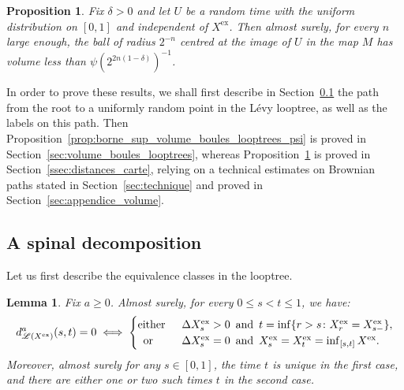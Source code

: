 \documentclass[british, a4paper,11pt]{article}
\numberwithin{equation}{section}
\newtheorem{lem}[thm]{Lemma}
\newtheorem{prop}[thm]{Proposition}
\theoremstyle{definition}
\newcommand{\Loop}{\mathscr{L}}
\newcommand{\Map}{M}
\newcommand{\exc}{\mathrm{ex}}
\begin{document}
\begin{prop}\label{prop:borne_sup_volume_boules_cartes_psi}
Fix $\delta > 0$ and let $U$ be a random time with the uniform distribution on $[0,1]$ and independent of $X^{\exc}$.
Then almost surely, for every $n$ large enough, the ball of radius $2^{-n}$ centred at the image of $U$ in the map $\Map$ has volume less than $\psi(2^{2n(1-\delta)})^{-1}$.
\end{prop}



In order to prove these results, we shall first describe in Section~\ref{ssec:epine} the path from the root to a uniformly random point in the L\'evy looptree, as well as the labels on this path.
Then Proposition~\ref{prop:borne_sup_volume_boules_looptrees_psi} is proved in Section~\ref{sec:volume_boules_looptrees}, whereas Proposition~\ref{prop:borne_sup_volume_boules_cartes_psi} is proved in Section~\ref{ssec:distances_carte}, relying on a technical estimates on Brownian paths stated in Section~\ref{sec:technique} and proved in Section~\ref{sec:appendice_volume}.



\subsection{A spinal decomposition}
\label{ssec:epine}

Let us first describe the equivalence classes in the looptree.

\begin{lem}\label{lem:identifications_looptree_Levy}
Fix $a \geq 0$. Almost surely, for every $0 \le s < t \le 1$, we have:
\[d^a_{\Loop(X^{\exc})}(s,t) = 0 
\iff 
\begin{cases}
\text{either}\enskip &\Delta X^{\exc}_s > 0 \enskip\text{and}\enskip t = \inf\{r>s \colon X^{\exc}_{r} = X^{\exc}_{s-}\},
\\
\enskip\text{or}\enskip &\Delta X^{\exc}_s = 0 \enskip\text{and}\enskip X^{\exc}_{s} = X^{\exc}_{t} = \inf_{[s,t]} X^{\exc}.
\end{cases}
\]
Moreover, almost surely for any $s \in [0,1]$, the time $t$ is unique in the first case, and there are either one or two such times $t$ in the second case.
\end{lem}
\end{document}
